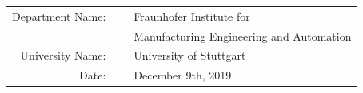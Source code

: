 \begin{titlepage}
\begin{center}
			\vspace{1cm}
		
			\large
			\begin{tabular}{r l l}
				Department Name: & \ & Fraunhofer Institute for\\
				& \ & Manufacturing Engineering and Automation\\[1mm]
				University Name: & \ & University of Stuttgart\\[1mm]
				Date: & \ & December 9th, 2019\\
			\end{tabular}
		\endgroup	
		
	\end{center}
	
\end{titlepage}